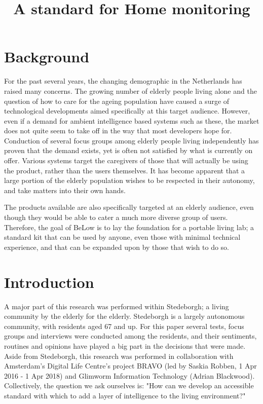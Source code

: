 \documentclass{below-ext}
\title{A standard for Home monitoring}
\author{
  \vspace{-1.5em} 
  \alignauthor{
  	\textbf{Patrick Hendriks}\\
  	\email{patrick.hendriks@hva.nl}
  }
  \vfil
  \alignauthor{
  	\textbf{Mats Otten}\\
  	\email{mats.otten@hva.nl}
  }
  \vfil
  \alignauthor{
  	\textbf{Suzanne Peerdeman}\\
  	\email{suzanne.peerdeman@hva.nl}
  }
  \vfil
  \alignauthor{
  	\textbf{Hogeschool van Amsterdam}\\
  	\affaddr{Wibautstraat 2-4}\\
  	\affaddr{1091 GM, Amsterdam}\\
  }
  \vfil
  \alignauthor{
  	\textbf{Glimworm IT BV}\\
  	\affaddr{Kattenburgerstraat 5}\\
  	\affaddr{1018 JA Amsterdam}\\
  }
}
\begin{document}
\maketitle

\begin{abstract}
\end{abstract}

\section{Background}
For the past several years, the changing demographic in the Netherlands has raised many concerns. The growing number of elderly people living alone and the question of how to care for the ageing population have caused a surge of technological developments aimed specifically at this target audience. However, even if a demand for ambient intelligence based systems such as these, the market does not quite seem to take off in the way that most developers hope for. Conduction of several focus groups among elderly people living independently has proven that the demand exists, yet is often not satisfied by what is currently on offer. Various systems target the caregivers of those that will actually be using the product, rather than the users themselves. It has become apparent that a large portion of the elderly population wishes to be respected in their autonomy, and take matters into their own hands.

The products available are also specifically targeted at an elderly audience, even though they would be able to cater a much more diverse group of users. Therefore, the goal of BeLow is to lay the foundation for a portable living lab; a standard kit that can be used by anyone, even those with minimal technical experience, and that can be expanded upon by those that wish to do so.

\section{Introduction}
A major part of this research was performed within Stedeborgh; a living community by the elderly for the elderly. Stedeborgh is a largely autonomous community, with residents aged 67 and up. For this paper several tests, focus groups and interviews were conducted among the residents, and their sentiments, routines and opinions have played a big part in the decisions that were made. Aside from Stedeborgh, this research was performed in collaboration with Amsterdam's Digital Life Centre's project BRAVO (led by Saskia Robben, 1 Apr 2016 - 1 Apr 2018) and Glimworm Information Technology (Adrian Blackwood). Collectively, the question we ask ourselves is: "How can we develop an accessible standard with which to add a layer of intelligence to the living environment?" 
\end{document}
